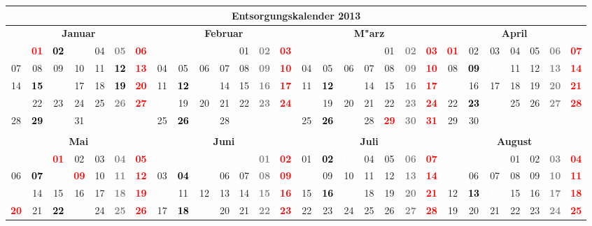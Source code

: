 \documentclass[10pt,a4paper,landscape]{article}
\newcommand{\bb}[1]{\cellcolor{MidnightBlue}\textcolor{white}{\bf #1}}
\newcommand{\gb}[1]{\cellcolor{SpringGreen}\textcolor{black}{\bf #1}}
\newcommand{\yb}[1]{\cellcolor{yellow}\textcolor{black}{\bf #1}}
\newcommand{\iv}[1]{\cellcolor{black}\textcolor{white}{\bf #1}}
\newcommand{\rb}[1]{\textbf{\textcolor{red}{#1}}}
\newcommand{\hv}[1]{\textbf{\textcolor{Gray}{#1}}}
\begin{document}
\begin{tabular}{|ccccccc|ccccccc|ccccccc|ccccccc|}
\hline
\multicolumn{28}{|c|}{\textbf{Entsorgungskalender 2013}} \\\hline
\multicolumn{7}{|c|}{\bf Januar} & \multicolumn{7}{|c|}{\bf Februar} & \multicolumn{7}{|c|}{\bf M"arz} & \multicolumn{7}{|c|}{\bf April} \\
& \rb{01} & \yb{02} & \iv{03} & 04 & \hv{05} & \rb{06} & & & & & 01 & \hv{02} & \rb{03} & & & & & 01 & \hv{02} & \rb{03} & \rb{01} & 02 & 03 & 04 & 05 & \hv{06} & \rb{07} \\
07 & 08 & 09 & 10 & 11 & \gb{12} & \rb{13} & 04 & 05 & 06 & 07 & 08 & \hv{09} & \rb{10} & 04 & 05 & 06 & 07 & 08 & \hv{09} & \rb{10} & 08 & \yb{09} & \iv{10} & 11 & 12 & \hv{13} & \rb{14} \\
14 & \yb{15} & \iv{16} & 17 & 18 & \gb{19} & \rb{20} & 11 & \yb{12} & \iv{13} & 14 & 15 & \hv{16} & \rb{17} & 11 & \yb{12} & \iv{13} & 14 & 15 & \hv{16} & \rb{17} & \bb{15} & 16 & 17 & 18 & 19 & \hv{20} & \rb{21} \\
\bb{21} & 22 & 23 & 24 & 25 & \hv{26} & \rb{27} & \bb{18} & 19 & 20 & 21 & 22 & \hv{23} & \rb{24} & \bb{18} & 19 & 20 & 21 & 22 & \hv{23} & \rb{24} & 22 & \yb{23} & \iv{24} & 25 & 26 & \hv{27} & \rb{28} \\
28 & \yb{29} & \iv{30} & 31 & & & & 25 & \yb{26} & \iv{27} & 28 & & & & 25 & \yb{26} & \iv{27} & 28 & \rb{29} & \hv{30} & \rb{31} & 29 & 30 &  &  &  &  &  \\
& & & & & & & & & & & & & & & & & & & & &  &  &  &  &  &  &  \\
\hline
\multicolumn{7}{|c|}{\bf Mai} & \multicolumn{7}{|c|}{\bf Juni} & \multicolumn{7}{|c|}{\bf Juli} & \multicolumn{7}{|c|}{\bf August} \\
& & \rb{01} & 02 & 03 & \hv{04} & \rb{05} & & & & & & \hv{01} & \rb{02} & 01 & \yb{02} & \iv{03} & 04 & 05 & \hv{06} & \rb{07} & & & & 01 & 02 & \hv{03} & \rb{04} \\
06 & \yb{07} & \iv{08} & \rb{09} & 10 & \hv{11} & \rb{12} & 03 & \yb{04} & \iv{05} & 06 & 07 & \hv{08} & \rb{09} & \bb{08} & 09 & 10 & 11 & 12 & \hv{13} & \rb{14} & \bb{05} & 06 & 07 & 08 & 09 & \hv{10} & \rb{11} \\
\bb{13} & 14 & 15 & 16 & 17 & \hv{18} & \rb{19} & \bb{10} & 11 & 12 & 13 & 14 & \hv{15} & \rb{16} & 15 & \yb{16} & \iv{17} & 18 & 19 & \hv{20} & \rb{21} & 12 & \yb{13} & \iv{14} & 15 & 16 & \hv{17} & \rb{18} \\
\rb{20} & 21 & \yb{22} & \iv{23} & 24 & \hv{25} & \rb{26} & 17 & \yb{18} & \iv{19} & 20 & 21 & \hv{22} & \rb{23} & 22 & 23 & 24 & 25 & 26 & \hv{27} & \rb{28} & 19 & 20 & 21 & 22 & 23 & \hv{24} & \rb{25} \\

\end{tabular}
\end{document}
